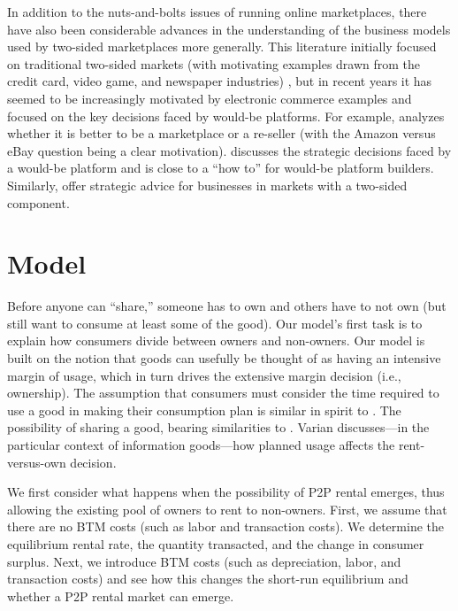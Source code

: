 \documentclass[11pt]{article}
\begin{document}
In addition to the nuts-and-bolts issues of running online marketplaces, there have also been considerable advances in the understanding of the business models used by two-sided marketplaces more generally. 
This literature initially focused on traditional two-sided markets (with motivating examples drawn from the credit card, video game, and  newspaper industries) \citep{rochet2003platform, rochet2006two}, 
but in recent years it has seemed to be increasingly motivated by electronic commerce examples and focused on the key decisions faced by would-be platforms.
For example, \cite{hagiu2014marketplace} analyzes whether it is better to be a marketplace or a re-seller (with the Amazon versus eBay question being a clear motivation).
\cite{hagiu2014strategic} discusses the strategic decisions faced by a would-be platform and is close to a ``how to'' for would-be platform builders.
Similarly, \cite{eisenmann2006strategies} offer strategic advice for businesses in markets with a two-sided component.  

\section{Model} \label{sec:model}

Before anyone can ``share,'' someone has to own and others have to not own (but still want to consume at least some of the good).
Our model's first task is to explain how consumers divide between owners and non-owners. 
Our model is built on the notion that goods can usefully be thought of as having an intensive margin of usage, which in turn drives the extensive margin decision (i.e., ownership). 
The assumption that consumers must consider the time required to use a good in making their consumption plan is similar in spirit to \cite{becker1965theory}.
The possibility of sharing a good, bearing similarities to \cite{varian2000}.
Varian discusses---in the particular context of information goods---how planned usage affects the rent-versus-own decision. 

We first consider what happens when the possibility of P2P rental emerges, thus allowing the existing pool of owners to rent to non-owners. 
First, we assume that there are no BTM costs (such as labor and transaction costs).
We determine the equilibrium rental rate, the quantity transacted, and the change in consumer surplus. 
Next, we introduce BTM costs (such as depreciation, labor, and transaction costs) and see how this changes the short-run equilibrium and whether a P2P rental market can emerge. 
\end{document}

